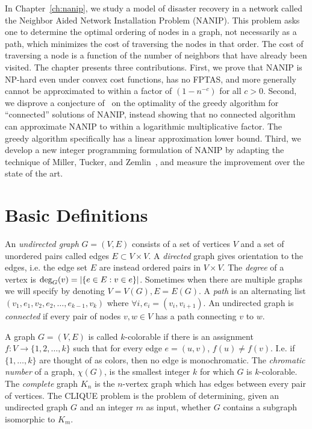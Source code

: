 In Chapter~\ref{ch:nanip}, we study a model of disaster recovery in a network
called the Neighbor Aided Network Installation Problem (NANIP). This problem
asks one to determine the optimal ordering of nodes in a graph, not necessarily
as a path, which minimizes the cost of traversing the nodes in that order. The
cost of traversing a node is a function of the number of neighbors that have
already been visited. The chapter presents three contributions. First, we prove
that NANIP is NP-hard even under convex cost functions, has no FPTAS, and more
generally cannot be approximated to within a factor of $(1-n^{-c})$ for all
$c>0$. Second, we disprove a conjecture of~\cite{Gutfraind14} on the optimality
of the greedy algorithm for ``connected'' solutions of NANIP, instead showing
that no connected algorithm can approximate NANIP to within a logarithmic
multiplicative factor. The greedy algorithm specifically has a linear
approximation lower bound. Third, we develop a new integer programming
formulation of NANIP by adapting the technique of Miller, Tucker, and
Zemlin~\cite{miller1960integer}, and measure the improvement over the state of
the art.~\cite{Gutfraind14}
 
\section{Basic Definitions}

An \emph{undirected graph} $G = (V,E)$ consists of a set of vertices $V$ and a
set of unordered pairs called edges $E \subset V \times V$. A \emph{directed}
graph gives orientation to the edges, i.e. the edge set $E$ are instead ordered
pairs in $V \times V$. The \emph{degree} of a vertex is $\textup{deg}_G(v) =
|\{e \in E : v \in e \}|$.  Sometimes when there are multiple graphs we will
specify by denoting $V = V(G), E = E(G)$. A \emph{path} is an alternating list
$(v_1, e_1, v_2, e_2, \dots, e_{k-1}, v_k)$ where $\forall i, e_i =
(v_i,v_{i+1})$. An undirected graph is \emph{connected} if every pair of nodes
$v,w \in V$ has a path connecting $v$ to $w$.

A graph $G = (V,E)$ is called $k$-colorable if there is an assignment $f:V \to \{
1, 2, \dots, k \}$ such that for every edge $e = (u,v)$, $f(u) \neq f(v)$. I.e.
if $\{1,\dots, k\}$ are thought of as colors, then no edge is monochromatic.
The \emph{chromatic number} of a graph, $\chi(G)$, is the smallest integer $k$
for which $G$ is $k$-colorable. The \emph{complete} graph $K_n$ is the
$n$-vertex graph which has edges between every pair of vertices. The CLIQUE
problem is the problem of determining, given an undirected graph $G$ and an
integer $m$ as input, whether $G$ contains a subgraph isomorphic to $K_m$.

